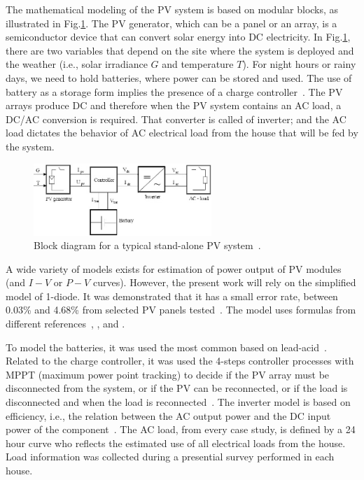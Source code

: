 \documentclass[runningheads]{llncs}
\begin{document}
The mathematical modeling of the PV system is based on modular blocks, as illustrated in Fig.\ref{fig:blockdiagram}. %
The PV generator, which can be a panel or an array, is a semiconductor device that can convert solar energy into DC electricity. In Fig.\ref{fig:blockdiagram}, there are two variables that depend on the site where the system is deployed and the weather (i.e., solar irradiance $G$ and temperature $T$). For night hours or rainy days, we need to hold batteries, where power can be stored and used. The use of battery as a storage form implies the presence of a charge controller~\cite{Hansen}. The PV arrays produce DC and therefore when the PV system contains an AC load, a DC/AC conversion is required. That converter is called of inverter; and the AC load dictates the behavior of AC electrical load from the house that will be fed by the system.
\begin{figure}[h]
\includegraphics[width=0.6\textwidth]{blockdiagramPVS2}
\centering
\caption{Block diagram for a typical stand-alone PV system~\cite{Hansen}.}
\label{fig:blockdiagram} 
\end{figure}
A wide variety of models exists for estimation of power output of PV modules (and $I-V$ or $P-V$ curves). However, the present work will rely on the simplified model of 1-diode. It was demonstrated that it has a small error rate, between 0.03\% and 4.68\% from selected PV panels tested~\cite{Saloux}. The model uses formulas from different references~\cite{Hansen}, \cite{Saloux}, and \cite{Ross}.

To model the batteries, it was used the most common based on lead-acid~\cite{Copetti}. Related to the charge controller, it was used the 4-steps controller processes with MPPT (maximum power point tracking) to decide if the PV array must be disconnected from the system, or if the PV can be reconnected, or if the load is disconnected and when the load is reconnected~\cite{Hansen}. The inverter model is based on efficiency, i.e., the relation between the AC output power and the DC input power of the component~\cite{Hansen}. The AC load, from every case study, is defined by a 24 hour curve who reflects the estimated use of all electrical loads from the house. Load information was collected during a presential survey performed in each house.
\end{document}
